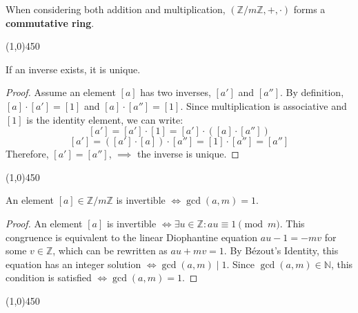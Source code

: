 \begin{proposition}
When considering both addition and multiplication, $(\mathbb{Z}/m\mathbb{Z}, +, \cdot)$ forms a \textbf{commutative ring}.
\end{proposition}

\begin{center}
    \vspace{10pt}
    \line(1,0){450}
    \vspace{25pt}
\end{center}

\begin{theorem}
If an inverse exists, it is unique.
\end{theorem}
\begin{proof}
Assume an element $[a]$ has two inverses, $[a']$ and $[a'']$. By definition, $[a] \cdot [a'] = [1]$ and $[a] \cdot [a''] = [1]$. Since multiplication is associative and $[1]$ is the identity element, we can write:
$$ [a'] = [a'] \cdot [1] = [a'] \cdot ([a] \cdot [a'']) $$
$$ [a'] = ([a'] \cdot [a]) \cdot [a''] = [1] \cdot [a''] = [a''] $$
Therefore, $[a'] = [a'']$, $\implies$ the inverse is unique.
\end{proof}

\begin{center}
    \vspace{10pt}
    \line(1,0){450}
    \vspace{25pt}
\end{center}

\begin{theorem}
An element $[a] \in \mathbb{Z}/m\mathbb{Z}$ is invertible $\iff \gcd(a, m) = 1$.
\end{theorem}
\begin{proof}
An element $[a]$ is invertible $\iff \exists u \in \mathbb{Z} : a u \equiv 1 \pmod{m}$.
This congruence is equivalent to the linear Diophantine equation $a u - 1 = -m v$ for some $v \in \mathbb{Z}$, which can be rewritten as $a u + m v = 1$.
By Bézout's Identity, this equation has an integer solution $\iff \gcd(a, m) \mid 1$.
Since $\gcd(a, m) \in \mathbb{N}$, this condition is satisfied $\iff \gcd(a, m) = 1$. \qedhere
\end{proof}

\begin{center}
    \vspace{10pt}
    \line(1,0){450}
    \vspace{25pt}
\end{center}


